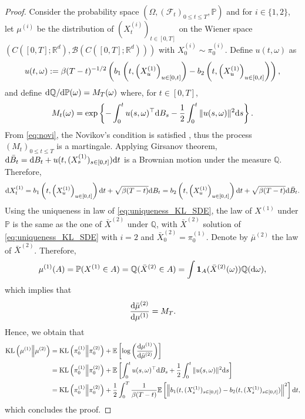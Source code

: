 \documentclass[english,graybox,envcountchap,envcountsame,sectrefs,shortlabels]{svmono}
\theoremstyle{style}
\newcommand{\eqsp}{}
\newcommand{\kl}{\mathrm{KL}}
\begin{document}
\begin{proof}
Consider the probability space $(\Omega,(\mathcal{F}_t)_{0\leq t\leq T},\mathbb{P})$ and for $i \in\{1,2\}$, let \( \mu^{(i)} \) be the distribution of \( ( X_t^{(i)})_{t \in [0,T]} \) on the Wiener space \( (C([0, T]; \mathbb{R}^d), \mathcal{B}(C([0, T]; \mathbb{R}^d))) \) with \( X_0^{(i)} \sim \pi_0^{(i)} \). Define $u(t,\omega)$ as
\begin{align*}
u(t,\omega) \eqdef \sched(T-t)^{-1/2}\left( b_1\left(t, \left(X^{(1)}_u\right)_{ u \in [0,t]}\right) -  b_2\left(t, \left(X^{(1)}_u\right)_{ u \in [0,t]}\right)\right)\eqsp,
\end{align*}
and define $\mathrm{d} \mathbb{Q}/\mathrm{d}\mathbb{P}(\omega) = M_T (\omega)$ where, for $t \in[0,T]$,
\begin{align*}
    M_t(\omega)  = \exp\left\{ - \int_0^t u(s, \omega)^\top \rmd B_s - \frac{1}{2} \int_0^t \|u (s , \omega)\|^2 \rmd s\right\}\eqsp.
\end{align*}
From \eqref{eq:novi}, the Novikov's condition is satisfied \cite[Chapter 3.5.D]{karatzas2012brownian}, thus the process $(M_t)_{0\leq t\leq T}$ is a martingale. 
Applying Girsanov theorem,  $\mathrm{d} \bar B_t = \mathrm{d} B_t + u(t, (X^{(1)}_s)_{s \in [0,t]}) \mathrm{d} t$ is a Brownian motion under the measure $\mathbb{Q}$. Therefore,
\begin{align*}
\rmd X_t^{(1)} = b_1\left(t, \left(X^{(1)}_u\right)_{ u \in [0,t]}\right) \rmd t + \sqrt{\sched(T-t)} \rmd B_t =
b_2\left(t, \left(X^{(1)}_u\right)_{ u \in [0,t]}\right) \rmd t + \sqrt{\sched(T-t)} \rmd \bar B_t\eqsp.
\end{align*}
Using the uniqueness in law of \eqref{eq:uniqueness_KL_SDE}, the law of $X^{(1)}$ under $\mathbb{P}$ is the same as the one of $\bar X^{(2)}$ under $\mathbb{Q}$, with $\bar X^{(2)}$ solution of \eqref{eq:uniqueness_KL_SDE} with $i=2$ and $\bar X^{(2)}_0=\pi^{(1)}_0$. Denote by $\bar\mu^{(2)}$ the law of $\bar X^{(2)}$.
Therefore,
\begin{eqnarray*}
\mu^{(1)}(A) = \mathbb{P}(X^{(1)}\in A) = \mathbb{Q}(\bar X^{(2)}\in A) = \int \1_A(\bar X^{(2)}(\omega))\mathbb{Q}(\rmd\omega) \eqsp,%
\end{eqnarray*}
which implies that
\begin{align*}
\frac{\rmd \bar\mu^{(2)}}{\rmd \mu^{(1)}} =  M_T\eqsp.
\end{align*}
Hence, we obtain that
\begin{align*}
  \kl \left(\mu^{(1)} \middle\| \mu^{(2)}\right) 
  &= \kl \left( \pi_0^{(1)} \middle\| \pi_0^{(2)} \right) + \mathbb{E}  \left[\log\left(\frac{\rmd \mu^{(1)}}{\rmd \bar \mu^{(2)}}\right)\right]\\
  & = \kl \left( \pi_0^{(1)} \middle\| \pi_0^{(2)} \right) +  \mathbb{E}  \left[  \int_0^t u(s, \omega)^\top \rmd B_s + \frac{1}{2} \int_0^t \|u (s , \omega)\|^2 \rmd s \right] \\
  &= \kl \left( \pi_0^{(1)} \middle\| \pi_0^{(2)} \right) +  \frac{1}{2} \int_0^T \frac{1}{\sched(T-t)} \mathbb{E}\left[ \left\| b_1(t, (X_s^{(1)})_{s \in [0, t]}) - b_2(t, (X_s^{(1)})_{s \in [0, t]}) \right\|^2 \right] \rmd t\eqsp,
\end{align*}
which concludes the proof.
\end{proof}
\end{document}
